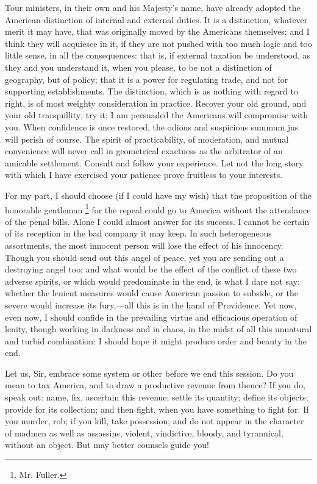 Tour ministers, in their own and his Majesty's name, have already adopted the American distinction of internal and external duties. It is a distinction, whatever merit it may have, that was originally moved by the Americans themselves; and I think they will acquiesce in it, if they are not pushed with too much logic and too little sense, in all the consequences: that is, if external taxation be understood, as they and you understand it, when you please, to be not a distinction of geography, but of policy; that it is a power for regulating trade, and not for supporting establishments. The distinction, which is as nothing with regard to right, is of most weighty consideration in practice. Recover your old ground, and your old tranquillity; try it; I am persuaded the Americans will compromise with you. When confidence is once restored, the odious and suspicious summum jus will perish of course. The spirit of practicability, of moderation, and mutual convenience will never call in geometrical exactness as the arbitrator of an amicable settlement. Consult and follow your experience. Let not the long story with which I have exercised your patience prove fruitless to your interests.

For my part, I should choose (if I could have my wish) that the proposition of the honorable gentleman
\footnote{Mr. Fuller.}
for the repeal could go to America without the attendance of the penal bills. Alone I could almost answer for its success. I cannot be certain of its reception in the bad company it may keep. In such heterogeneous assortments, the most innocent person will lose the effect of his innocency. Though you should send out this angel of peace, yet you are sending out a destroying angel too; and what would be the effect of the conflict of these two adverse spirits, or which would predominate in the end, is what I dare not say: whether the lenient measures would cause American passion to subside, or the severe would increase its fury,—all this is in the hand of Providence. Yet now, even now, I should confide in the prevailing virtue and efficacious operation of lenity, though working in darkness and in chaos, in the midst of all this unnatural and turbid combination: I should hope it might produce order and beauty in the end.

Let us, Sir, embrace some system or other before we end this session. Do you mean to tax America, and to draw a productive revenue from thence? If you do, speak out: name, fix, ascertain this revenue; settle its quantity; define its objects; provide for its collection; and then fight, when you have something to fight for. If you murder, rob; if you kill, take possession; and do not appear in the character of madmen as well as assassins, violent, vindictive, bloody, and tyrannical, without an object. But may better counsels guide you!

